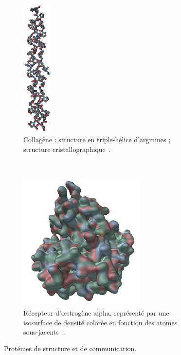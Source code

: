 	\begin{figure}[H]
		\begin{subfigure}[t]{.3\textwidth}
			\centering
			\includegraphics[height=7cm]{./figures/ch1/collagen}
			\caption[Collagène.]{Collagène : structure en triple-hélice d'arginines ; structure cristallographique~\cite{okuyama2014preferred}.}
			\label{fig:collagen}
		\end{subfigure}
		~
		\begin{subfigure}[t]{.7\textwidth}
			\centering
			\includegraphics[height=7cm]{./figures/ch1/eralpha}
			\caption[Récepteur d'œstrogène alpha.]{Récepteur d'œstrogène alpha, représenté par une isosurface de densité colorée en fonction des atomes sous-jacents~\cite{nwachukwu2016systems}.}
			\label{fig:eralpha}
		\end{subfigure}
		\caption[Protéines de structure et de communication.]{Protéines de structure et de communication.}
		\label{fig:prot_misc}
	\end{figure}
	
